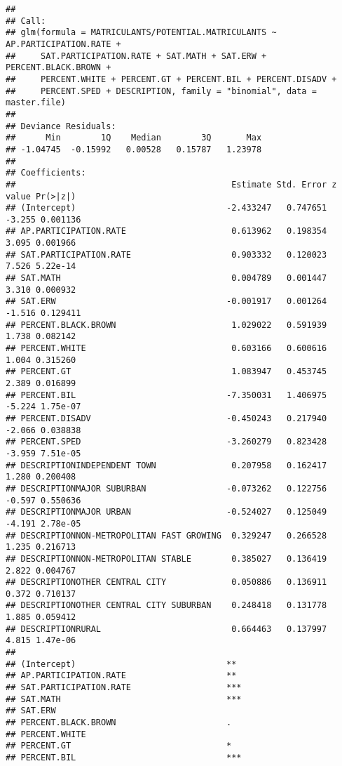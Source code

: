 \documentclass[
]{article}
\begin{document}
\begin{verbatim}
## 
## Call:
## glm(formula = MATRICULANTS/POTENTIAL.MATRICULANTS ~ AP.PARTICIPATION.RATE + 
##     SAT.PARTICIPATION.RATE + SAT.MATH + SAT.ERW + PERCENT.BLACK.BROWN + 
##     PERCENT.WHITE + PERCENT.GT + PERCENT.BIL + PERCENT.DISADV + 
##     PERCENT.SPED + DESCRIPTION, family = "binomial", data = master.file)
## 
## Deviance Residuals: 
##      Min        1Q    Median        3Q       Max  
## -1.04745  -0.15992   0.00528   0.15787   1.23978  
## 
## Coefficients:
##                                           Estimate Std. Error z value Pr(>|z|)
## (Intercept)                              -2.433247   0.747651  -3.255 0.001136
## AP.PARTICIPATION.RATE                     0.613962   0.198354   3.095 0.001966
## SAT.PARTICIPATION.RATE                    0.903332   0.120023   7.526 5.22e-14
## SAT.MATH                                  0.004789   0.001447   3.310 0.000932
## SAT.ERW                                  -0.001917   0.001264  -1.516 0.129411
## PERCENT.BLACK.BROWN                       1.029022   0.591939   1.738 0.082142
## PERCENT.WHITE                             0.603166   0.600616   1.004 0.315260
## PERCENT.GT                                1.083947   0.453745   2.389 0.016899
## PERCENT.BIL                              -7.350031   1.406975  -5.224 1.75e-07
## PERCENT.DISADV                           -0.450243   0.217940  -2.066 0.038838
## PERCENT.SPED                             -3.260279   0.823428  -3.959 7.51e-05
## DESCRIPTIONINDEPENDENT TOWN               0.207958   0.162417   1.280 0.200408
## DESCRIPTIONMAJOR SUBURBAN                -0.073262   0.122756  -0.597 0.550636
## DESCRIPTIONMAJOR URBAN                   -0.524027   0.125049  -4.191 2.78e-05
## DESCRIPTIONNON-METROPOLITAN FAST GROWING  0.329247   0.266528   1.235 0.216713
## DESCRIPTIONNON-METROPOLITAN STABLE        0.385027   0.136419   2.822 0.004767
## DESCRIPTIONOTHER CENTRAL CITY             0.050886   0.136911   0.372 0.710137
## DESCRIPTIONOTHER CENTRAL CITY SUBURBAN    0.248418   0.131778   1.885 0.059412
## DESCRIPTIONRURAL                          0.664463   0.137997   4.815 1.47e-06
##                                             
## (Intercept)                              ** 
## AP.PARTICIPATION.RATE                    ** 
## SAT.PARTICIPATION.RATE                   ***
## SAT.MATH                                 ***
## SAT.ERW                                     
## PERCENT.BLACK.BROWN                      .  
## PERCENT.WHITE                               
## PERCENT.GT                               *  
## PERCENT.BIL                              ***

\end{verbatim}
\end{document}

